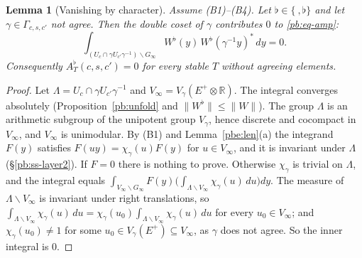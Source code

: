 \documentclass[10pt]{amsart}
\newtheorem{lemma}[theorem]{Lemma}
\theoremstyle{definition}
\theoremstyle{remark}
\newcommand{\R}{\mathbb R}
\begin{document}
\begin{lemma}[Vanishing by character]\label{pbe:vanish}
Assume \textup{(B1)--(B4)}. Let $\flat\in\{\ ,\flat\}$ and let $\gamma\in\Gamma_{c,s,c'}$ not agree.
Then the double coset of $\gamma$ contributes $0$ to \eqref{pb:eq-amp}:
\[
\int_{(U_c\cap\gamma U_{c'}\gamma^{-1})\backslash G_\infty}W^{\flat}(y)\,W^{\flat}(\gamma^{-1}y)^*\,dy=0.
\]
Consequently $A_T^\flat(c,s,c')=0$ for every stable $T$ without agreeing elements.
\end{lemma}
\begin{proof}
Let $\Lambda=U_c\cap\gamma U_{c'}\gamma^{-1}$ and $V_\infty=V_\gamma(E^+\otimes\R)$. The integral
converges absolutely (Proposition~\ref{pb:unfold} and $\|W^\flat\|\le\|W\|$). The group $\Lambda$
is an arithmetic subgroup of the unipotent group $V_\gamma$, hence discrete and cocompact in
$V_\infty$, and $V_\infty$ is unimodular. By (B1) and Lemma~\ref{pbe:len}(a) the integrand $F(y)$
satisfies $F(uy)=\chi_\gamma(u)F(y)$ for $u\in V_\infty$, and it is invariant under $\Lambda$
(\S\ref{pb:ss-layer2}). If $F=0$ there is nothing to prove. Otherwise $\chi_\gamma$ is trivial on
$\Lambda$, and the integral equals $\int_{V_\infty\backslash G_\infty}F(y)\bigl(\int_{\Lambda\backslash
V_\infty}\chi_\gamma(u)\,du\bigr)dy$. The measure of $\Lambda\backslash V_\infty$ is invariant under
right translations, so $\int_{\Lambda\backslash V_\infty}\chi_\gamma(u)\,du=\chi_\gamma(u_0)\int_{
\Lambda\backslash V_\infty}\chi_\gamma(u)\,du$ for every $u_0\in V_\infty$; and $\chi_\gamma(u_0)\ne1$
for some $u_0\in V_\gamma(E^+)\subseteq V_\infty$, as $\gamma$ does not agree. So the inner integral
is $0$.
\end{proof}
\end{document}
